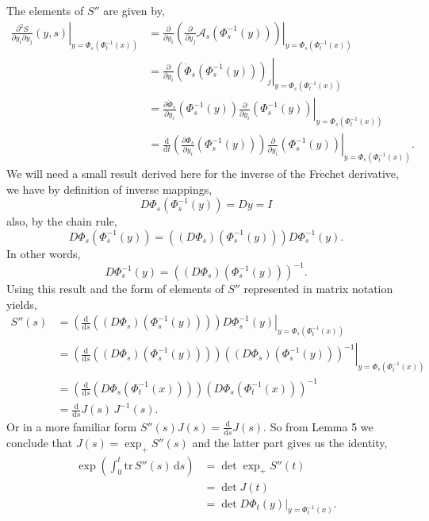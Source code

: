\documentclass[a4paper,12pt,draft]{report}
\begin{document}
{
The elements of $S''$ are given by,
\begin{align}
\left.\frac{\partial^2 S}{\partial y_i \partial y_j}(y, s)\right|_{y = \Phi_s(\Phi_t^{-1}(x))} & = \left.\frac{\partial}{\partial y_i}\left(\frac{\partial}{\partial y_j}\mathscr{A}_s(\Phi_s^{-1}(y))\right)\right|_{y = \Phi_s(\Phi_t^{-1}(x))}\nonumber\\
& = \left.\frac{\partial}{\partial y_i}\left(\dot{\Phi}_s(\Phi_s^{-1}(y))\right)_j\right|_{y = \Phi_s(\Phi_t^{-1}(x))}\nonumber\\
& = \left.\frac{\partial \dot{\Phi}_s}{\partial y_i}(\Phi_s^{-1}(y))\frac{\partial}{\partial y_i}(\Phi_s^{-1}(y))\right|_{y = \Phi_s(\Phi_t^{-1}(x))}\nonumber\\
& = \left.\frac{\mathrm{d}}{\mathrm{d}t}\left(\frac{\partial \Phi_s}{\partial y_i}(\Phi_s^{-1}(y))\right)\frac{\partial}{\partial y_i}(\Phi_s^{-1}(y))\right|_{y = \Phi_s(\Phi_t^{-1}(x))}.\nonumber
\end{align}
We will need a small result derived here for the inverse of the Fr$\acute{\text{e}}$chet derivative, we have by definition of inverse mappings,
$$
D\Phi_s(\Phi_s^{-1}(y)) = Dy = I
$$
also, by the chain rule,
$$
D\Phi_s(\Phi_s^{-1}(y)) = ((D\Phi_s)(\Phi_s^{-1}(y)))D\Phi_s^{-1}(y).
$$
In other words,
$$
D\Phi_s^{-1}(y) = ((D\Phi_s)(\Phi_s^{-1}(y)))^{-1}.
$$
Using this result and the form of elements of $S''$ represented in matrix notation yields,
\begin{align}
S''(s) & = \left.\left(\frac{\mathrm{d}}{\mathrm{d}s}((D\Phi_s)(\Phi_s^{-1}(y)))\right)D\Phi_s^{-1}(y)\right|_{y = \Phi_s(\Phi_t^{-1}(x))}\nonumber\\
& = \left.\left(\frac{\mathrm{d}}{\mathrm{d}s}((D\Phi_s)(\Phi_s^{-1}(y)))\right)((D\Phi_s)(\Phi_s^{-1}(y)))^{-1}\right|_{y = \Phi_s(\Phi_t^{-1}(x))}\nonumber\\
& = \left(\frac{\mathrm{d}}{\mathrm{d}s}(D\Phi_s(\Phi_t^{-1}(x)))\right)(D\Phi_s(\Phi_t^{-1}(x)))^{-1}\nonumber\\
& = \frac{\mathrm{d}}{\mathrm{d}s}J(s)\,J^{-1}(s).\nonumber
\end{align}
Or in a more familiar form $S''(s)J(s) = \frac{\mathrm{d}}{\mathrm{d}s}J(s)$.  So from Lemma 5 we conclude that $J(s) = \exp_+S''(s)$ and the latter part gives us the identity,
\begin{align}
\exp\left(\int_0^t \mathrm{tr}\,S''(s)\,\mathrm{d}s\right) & = \det\exp_+ S''(t)\nonumber\\
& = \det J(t)\nonumber\\
& = \left.\det D\Phi_t(y)\right|_{y = \Phi_t^{-1}(x)}.\nonumber
\end{align}

\qedhere
}
\end{document}
